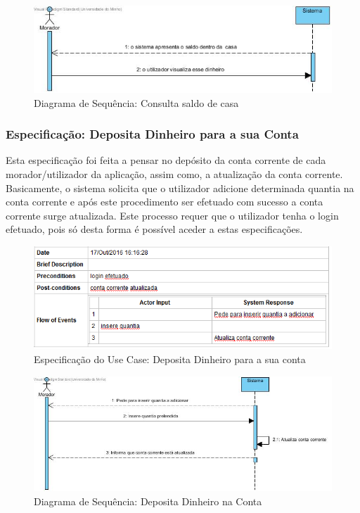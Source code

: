 \begin{figure}[htb!]
	\centering
	\includegraphics[scale=0.5]{imagens/diagramaSeq/ConsultaSaldodeCasa}  
	\caption{Diagrama de Sequência: Consulta saldo de casa  }  
\end{figure}


\subsubsection{Especificação: Deposita Dinheiro para a sua Conta }
Esta especificação foi feita a pensar no depósito da conta corrente de cada morador/utilizador da aplicação, assim como,  a atualização da conta corrente. Basicamente, o sistema solicita que o utilizador adicione determinada quantia na conta corrente e após este procedimento ser efetuado com sucesso a conta corrente surge atualizada. Este processo requer que o utilizador tenha o login efetuado, pois só desta forma é possível aceder a estas especificações.  
\begin{figure}[htb!]
	\centering
	\includegraphics[scale=0.6]{imagens/Especificacoes/depositadinheiro}  
	\caption{Especificação do Use Case: Deposita Dinheiro para a sua conta  }  
\end{figure}

\begin{figure}[htb!]
	\centering
	\includegraphics[scale=0.5]{imagens/diagramaSeq/DepositaDinheiroConta}  
	\caption{Diagrama de Sequência: Deposita Dinheiro na Conta}  
\end{figure}

